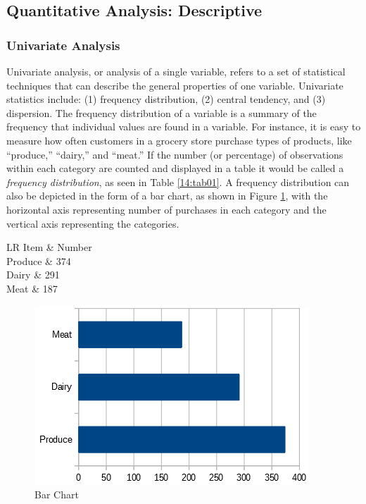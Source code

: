 \subsection{Quantitative Analysis: Descriptive}

\subsubsection{Univariate Analysis}

Univariate analysis, or analysis of a single variable, refers to a set of statistical techniques that can describe the general properties of one variable. Univariate statistics include: (1) frequency distribution, (2) central tendency, and (3) dispersion. The frequency distribution of a variable is a summary of the frequency that individual values are found in a variable. For instance, it is easy to measure how often customers in a grocery store purchase types of products, like ``produce,'' ``dairy,'' and ``meat.'' If the number (or percentage) of observations within each category are counted and displayed in a table it would be called a \textit{frequency distribution}, as seen in Table \ref{14:tab01}. A frequency distribution can also be depicted in the form of a bar chart, as shown in Figure \ref{14:fig01}, with the horizontal axis representing number of purchases in each category and the vertical axis representing the categories.

\begin{table}[H]
	\centering
	\begin{tabulary}{\linewidth}{LR}
		\hline
		Item & Number \\ 
		\hline
		Produce & 374 \\ 
		Dairy & 291 \\ 
		Meat & 187 \\ 
		\hline
	\end{tabulary} 
	\caption{Frequency Table}
	\label{14:tab01}
\end{table}

\vspace{.15in}

\begin{figure}[H]
	\centering
	\includegraphics[width=\maxwidth{.95\linewidth}]{gfx/14-BarChart}
	\caption{Bar Chart}
	\label{14:fig01}
\end{figure}

